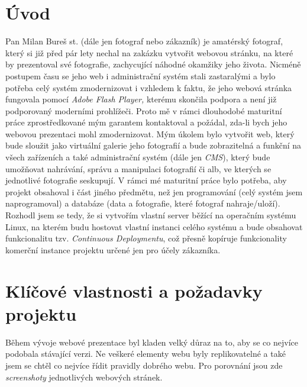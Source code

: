 \documentclass[12pt,a4paper]{report}
\begin{document}
  
  \chapter{Úvod}
  Pan Milan Bureš st. (dále jen fotograf nebo zákazník) je amatérský fotograf, který si již před pár lety
  nechal na zakázku vytvořit webovou stránku, na které by prezentoval své fotografie, zachycující
  náhodné okamžiky jeho života. Nicméně postupem času se jeho web i administrační systém stali
  zastaralými a bylo potřeba celý systém zmodernizovat i vzhledem k faktu, že jeho webová stránka
  fungovala pomocí \emph{Adobe Flash Player,} kterému skončila podpora a není již podporovaný
  moderními prohlížeči.
  Proto mě v rámci dlouhodobé maturitní práce zprostředkované mým garantem kontaktoval a
  požádal, zda-li bych jeho webovou prezentaci mohl zmodernizovat. Mým úkolem bylo vytvořit
  web, který bude sloužit jako virtuální galerie jeho fotografií a bude zobrazitelná a funkční na všech
  zařízeních a také administrační systém (dále jen \emph{CMS}), který bude umožňovat nahrávání, správu a
  manipulaci fotografií či alb, ve kterých se jednotlivé fotografie seskupují.
  V rámci mé maturitní práce bylo potřeba, aby projekt obsahoval i část jiného předmětu, než
  jen programování (celý systém jsem naprogramoval) a databáze (data a fotografie, které fotograf
  nahraje/uloží). Rozhodl jsem se tedy, že si vytvořím vlastní server běžící na operačním systému
  Linux, na kterém budu hostovat vlastní instanci celého systému a bude obsahovat funkcionalitu
  tzv. \emph{Continuous Deploymentu}, což přesně kopíruje funkcionality komerční instance projektu určené
  jen pro účely zákazníka.

  \chapter{Klíčové vlastnosti a požadavky projektu}
  Během vývoje webové prezentace byl kladen velký důraz na to, aby se co nejvíce podobala
  stávající verzi. Ne veškeré elementy webu byly replikovatelné a také jsem se chtěl co nejvíce řídit
  pravidly dobrého webu. Pro porovnání jsou zde \emph{screenshoty} jednotlivých webových stránek.
\end{document}
